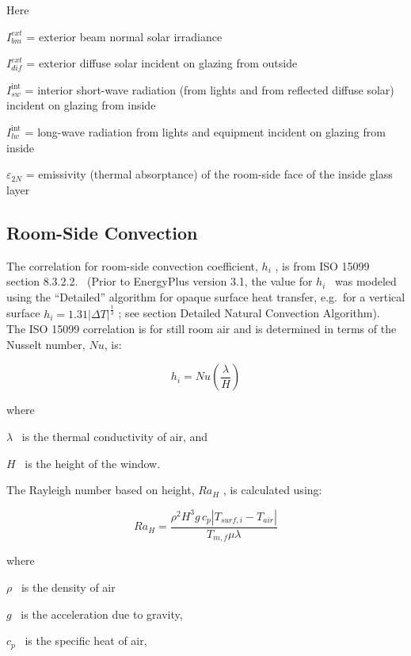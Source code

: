 Here

\(I_{bm}^{ext}\) = exterior beam normal solar irradiance

\(I_{dif}^{ext}\) = exterior diffuse solar incident on glazing from outside

\(I_{sw}^{{\mathop\mathrm{int}} }\) = interior short-wave radiation (from lights and from reflected diffuse solar) incident on glazing from inside

\(I_{lw}^{{\mathop\mathrm{int}} }\) = long-wave radiation from lights and equipment incident on glazing from inside

\({\varepsilon_{2N}}\) = emissivity (thermal absorptance) of the room-side face of the inside glass layer

\subsection{Room-Side Convection}\label{room-side-convection}

The correlation for room-side convection coefficient, \({h_i}\) , is from ISO 15099 section 8.3.2.2.~ (Prior to EnergyPlus version 3.1, the value for \({h_i}\) ~was modeled using the ``Detailed'' algorithm for opaque surface heat transfer, e.g.~for a vertical surface \({h_i} = 1.31{\left| {\Delta T} \right|^{{\frac{1}{3}}}}\) ; see section Detailed Natural Convection Algorithm).~ The ISO 15099 correlation is for still room air and is determined in terms of the Nusselt number, \(Nu\), is:

\begin{equation}
{h_i} = Nu\left( {\frac{\lambda }{H}} \right)
\end{equation}

where

\(\lambda\) ~is the thermal conductivity of air, and

\(H\) ~is the height of the window.

The Rayleigh number based on height, \(R{a_H}\) , is calculated using:

\begin{equation}
R{a_H} = \frac{{{\rho ^2}{H^3}g\,{c_p}\left| {{T_{surf,i}} - {T_{air}}} \right|}}{{{T_{m,f}}\mu \lambda }}
\end{equation}

where

\(\rho\) ~is the density of air

\(g\) ~is the acceleration due to gravity,

\({c_p}\) ~is the specific heat of air,

